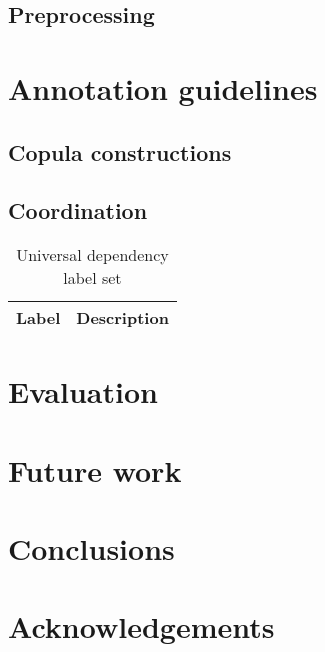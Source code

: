 \documentclass[a4paper,11pt, onecolumn]{article}
\begin{document}
\subsection{Preprocessing}

\cite{Washington14}


\section{Annotation guidelines}

\subsection{Copula constructions}

\subsection{Coordination}

\begin{table}
  \centering
  \begin{tabular}{|l|l|}
    \hline
    \textbf{Label} & \textbf{Description} \\

    \hline
  \end{tabular}
  \caption{Universal dependency label set}
\end{table}

\section{Evaluation}

\section{Future work}


\section{Conclusions}

\section*{Acknowledgements}



\end{document}
